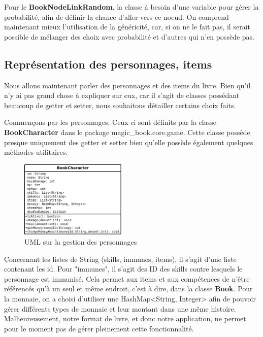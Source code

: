 			Pour le \textbf{BookNodeLinkRandom}, la classe à besoin d'une variable pour gérer la probabilité, afin de définir la chance d'aller vers ce noeud. On comprend maintenant mieux l'utilisation de la généricité, car, si on ne le fait pas, il serait possible de mélanger des choix avec probabilité et d'autres qui n'en possède pas.

		\subsection{Représentation des personnages, items}

			Nous allons maintenant parler des personnages et des items du livre. Bien qu'il n'y ai pas grand chose à expliquer sur eux, car il s'agit de classes possédant beaucoup de getter et setter, nous souhaitons détailler certains choix faits.

			Commençons par les personnages. Ceux ci sont définits par la classe \textbf{BookCharacter} dans le package magic\_book.core.game. Cette classe possède presque uniquement des getter et setter bien qu'elle possède également quelques méthodes utilitaires.

			\begin{figure}[H]
				\centering\includegraphics[width=0.45\textwidth, keepaspectratio]{img/book_character.png}
				\caption{UML sur la gestion des personnages}
			\end{figure}

			Concernant les listes de String (skills, immunes, items), il s'agit d'une liste contenant les id. Pour "immunes", il s'agit des ID des skills contre lesquels le personnage est immunisé. Cela permet aux items et aux compétences de n'être référencés qu'à un seul et même endroit, c'est à dire, dans la classe \textbf{Book}. Pour la monnaie, on a choisi d'utiliser une HashMap<String, Integer> afin de pouvoir gérer différents types de monnaie et leur montant dans une même histoire. Malheureusement, notre format de livre, et donc notre application, ne permet pour le moment pas de gérer pleinement cette fonctionnalité.

